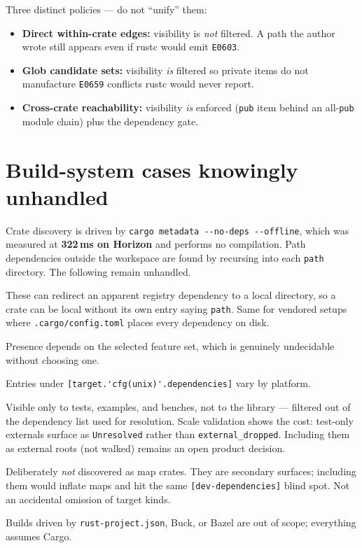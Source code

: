 \documentclass[11pt,a4paper]{article}
\begin{document}
Three distinct policies --- do not ``unify'' them:

\begin{itemize}[nosep]
  \item \textbf{Direct within-crate edges:} visibility is \emph{not} filtered.
    A path the author wrote still appears even if rustc would emit
    \verb|E0603|.
  \item \textbf{Glob candidate sets:} visibility \emph{is} filtered so private
    items do not manufacture \verb|E0659| conflicts rustc would never report.
  \item \textbf{Cross-crate reachability:} visibility \emph{is} enforced
    (\verb|pub| item behind an all-\verb|pub| module chain) plus the
    dependency gate.
\end{itemize}

\section{Build-system cases knowingly unhandled}

Crate discovery is driven by \verb|cargo metadata --no-deps --offline|, which
was measured at \textbf{322\,ms on Horizon} and performs no compilation. Path
dependencies outside the workspace are found by recursing into each
\verb|path| directory. The following remain unhandled.

\begin{description}[style=nextline,leftmargin=1em]
  \item[\texttt{[patch]} and \texttt{[replace]}.] These can redirect an apparent
    registry dependency to a local directory, so a crate can be local without its
    own entry saying \verb|path|. Same for vendored setups where
    \verb|.cargo/config.toml| places every dependency on disk.
  \item[Optional and feature-gated dependencies.] Presence depends on the
    selected feature set, which is genuinely undecidable without choosing one.
  \item[Target-specific dependencies.] Entries under
    \verb|[target.'cfg(unix)'.dependencies]| vary by platform.
  \item[Development dependencies.] Visible only to tests, examples, and benches,
    not to the library --- filtered out of the dependency list used for
    resolution. Scale validation shows the cost: test-only externals surface as
    \verb|Unresolved| rather than \verb|external_dropped|. Including them as
    external roots (not walked) remains an open product decision.
  \item[Examples, integration tests, benches, \texttt{build.rs}.]
    Deliberately \emph{not} discovered as map crates. They are secondary
    surfaces; including them would inflate maps and hit the same
    \verb|[dev-dependencies]| blind spot. Not an accidental omission of target
    kinds.
  \item[Non-Cargo projects.] Builds driven by \verb|rust-project.json|, Buck, or
    Bazel are out of scope; everything assumes Cargo.
\end{description}
\end{document}
